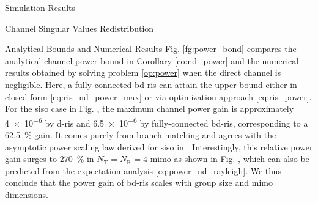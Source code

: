 \documentclass[journal]{IEEEtran}
\begin{document}
\begin{section}{Simulation Results}
\begin{subsection}{Channel Singular Values Redistribution}
\begin{subsubsection}{Analytical Bounds and Numerical Results}
		 Fig. \ref{fg:power_bond} compares the analytical channel power bound in Corollary \ref{co:nd_power} and the numerical results obtained by solving problem \eqref{op:power} when the direct channel is negligible.
		 Here, a fully-connected \gls{bd}-\gls{ris} can attain the upper bound either in closed form \eqref{eq:ris_nd_power_max} or via optimization approach \eqref{eq:ris_power}.
		 For the \gls{siso} case in Fig. , the maximum channel power gain is approximately \num{4e-6} by \gls{d}-\gls{ris} and \num{6.5e-6} by fully-connected \gls{bd}-\gls{ris}, corresponding to a \qty{62.5}{\percent} gain.
		 It comes purely from branch matching and agrees with the asymptotic power scaling law derived for \gls{siso} in \cite[(30)]{Shen2020a}.
		 Interestingly, this relative power gain surges to \qty{270}{\percent} in $N_\mathrm{T}=N_\mathrm{R}=4$ \gls{mimo} as shown in Fig. , which can also be predicted from the expectation analysis \eqref{eq:power_nd_rayleigh}.
		 We thus conclude that the power gain of \gls{bd}-\gls{ris} scales with group size and \gls{mimo} dimensions.
	 \end{subsubsection}

 \end{subsection}


\end{section}
\end{document}
